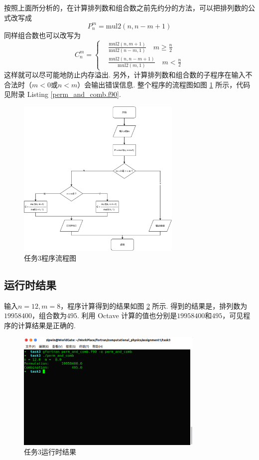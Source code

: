 \documentclass{article}
\begin{document}
	按照上面所分析的，在计算排列数和组合数之前先约分的方法，可以把排列数的公式改写成
	\[
	P_n^m=\mathrm{mul2}(n, n-m+1)
	\]
	同样组合数也可以改写为
	\[
	C_n^m=
	\begin{cases}
		&\frac{\mathrm{mul2}(n, m+1)}{\mathrm{mul2}(n-m, 1)} \quad m\ge \frac{n}{2} \\
		&\frac{\mathrm{mul2}(n, n-m+1)}{\mathrm{mul2}(m, 1)} \quad m<\frac{n}{2}
	\end{cases}
	\]
	这样就可以尽可能地防止内存溢出. 另外，计算排列数和组合数的子程序在输入不合法时（$m<0$或$n<m$）会输出错误信息. 整个程序的流程图如图 \ref{fig:perm_and_comb} 所示，代码见附录 Listing \ref{perm_and_comb.f90}. 
	\begin{figure}[h!tb]
		\centering
		\includegraphics[width=0.7\textwidth]{./utils/perm_and_comb.pdf}
		\caption{ 任务3程序流程图\label{fig:perm_and_comb}}
	\end{figure}
	\subsection{运行时结果}
	输入$n=12,m=8$，程序计算得到的结果如图 \ref{fig:rtr_pc} 所示. 得到的结果是，排列数为$19958400$，组合数为$495$. 利用 Octave 计算的值也分别是$19958400$和$495$，可见程序的计算结果是正确的.
	\begin{figure}[h!tb]
		\centering
		\includegraphics[width=0.8\textwidth]{./utils/rtr_pc.png}
		\caption{ 任务3运行时结果\label{fig:rtr_pc}}
	\end{figure}
	
\end{document}
